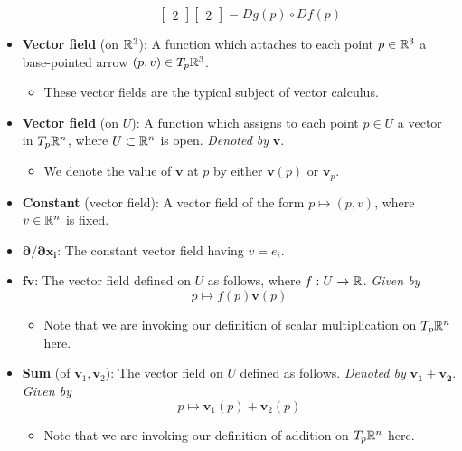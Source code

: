 \documentclass[../notes.tex]{subfiles}
\begin{document}
\begin{itemize}
\begin{itemize}
\begin{equation*}
\begin{bmatrix}
                2
            \end{bmatrix}
            \begin{bmatrix}
                2
            \end{bmatrix}
            = Dg(p)\circ Df(p)
        \end{equation*}
    \end{itemize}
    \item \textbf{Vector field} (on $\mathbb{R}^3$): A function which attaches to each point $p\in\mathbb{R}^3$ a base-pointed arrow $(p,v)\in T_p\mathbb{R}^3$.
    \begin{itemize}
        \item These vector fields are the typical subject of vector calculus.
    \end{itemize}
    \item \textbf{Vector field} (on $U$): A function which assigns to each point $p\in U$ a vector in $T_p\mathbb{R}^n$, where $U\subset\mathbb{R}^n$ is open. \emph{Denoted by} $\bm{v}$.
    \begin{itemize}
        \item We denote the value of $\bm{v}$ at $p$ by either $\bm{v}(p)$ or $\bm{v}_p$.
    \end{itemize}
    \item \textbf{Constant} (vector field): A vector field of the form $p\mapsto(p,v)$, where $v\in\mathbb{R}^n$ is fixed.
    \item $\bm{\partial/\partial x_i}$: The constant vector field having $v=e_i$.
    \item $\bm{f\pmb{v}}$: The vector field defined on $U$ as follows, where $f:U\to\mathbb{R}$. \emph{Given by}
    \begin{equation*}
        p \mapsto f(p)\bm{v}(p)
    \end{equation*}
    \begin{itemize}
        \item Note that we are invoking our definition of scalar multiplication on $T_p\mathbb{R}^n$ here.
    \end{itemize}
    \item \textbf{Sum} (of $\bm{v}_1,\bm{v}_2$): The vector field on $U$ defined as follows. \emph{Denoted by} $\bm{\pmb{v}_1+\pmb{v}_2}$. \emph{Given by}
    \begin{equation*}
        p \mapsto \bm{v}_1(p)+\bm{v}_2(p)
    \end{equation*}
    \begin{itemize}
        \item Note that we are invoking our definition of addition on $T_p\mathbb{R}^n$ here.

\end{itemize}
\end{itemize}
\end{document}

